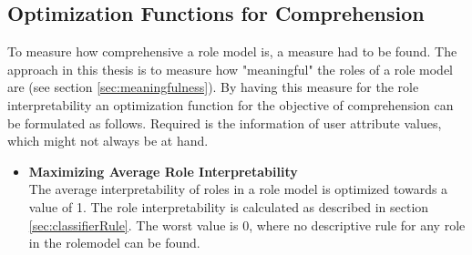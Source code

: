         \subsection{Optimization Functions for Comprehension}
        \label{sec:optimizationComprehension}
        To measure how comprehensive a role model is, a measure had to be found. The approach in this thesis is to measure how "meaningful" the roles of a role model are (see section \ref{sec:meaningfulness}). By having this measure for the role interpretability an optimization function for the objective of comprehension can be formulated as follows. Required is the information of user attribute values, which might not always be at hand.
        \begin{itemize}
            \item \textbf{Maximizing Average Role Interpretability}\\
            The average interpretability of roles in a role model is optimized towards a value of 1. The role interpretability is calculated as described in section \ref{sec:classifierRule}. The worst value is 0, where no descriptive rule for any role in the rolemodel can be found.
        \end{itemize}
